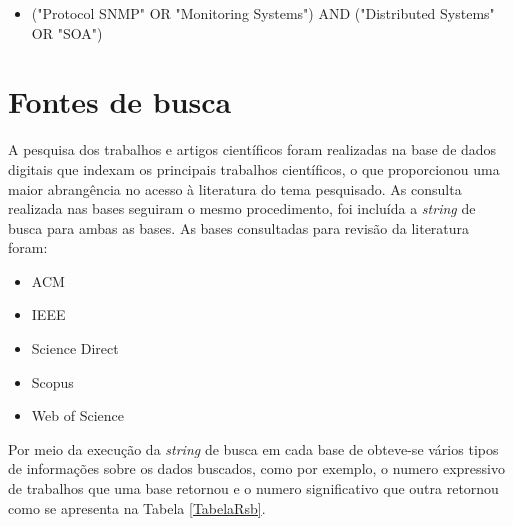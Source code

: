 \begin{itemize}
\item ("Protocol SNMP" OR "Monitoring Systems") AND ("Distributed Systems" OR "SOA")
\end{itemize}

\section{Fontes de busca}
A pesquisa dos trabalhos e artigos científicos foram realizadas na base de dados digitais que indexam os principais trabalhos científicos, o que proporcionou uma maior abrangência no acesso à literatura do tema pesquisado\cite{kitchenham2007guidelines}. 
As consulta realizada nas bases seguiram o mesmo procedimento, foi incluída a \textit{string} de busca para ambas as bases. As bases consultadas para revisão da literatura foram:
\begin{itemize}
\item ACM
\item IEEE
\item Science Direct
\item Scopus
\item Web of Science
\end{itemize}
Por meio da execução da \textit{string} de busca em cada base de obteve-se vários tipos de informações sobre os dados buscados, como por exemplo, o numero expressivo de trabalhos que uma base retornou e o numero significativo que outra retornou como se apresenta na Tabela \ref{TabelaRsb}.

